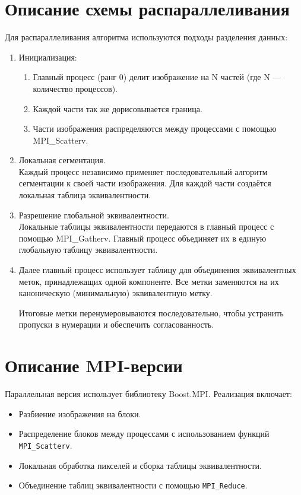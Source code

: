 \documentclass[a4paper,12pt]{article}
\begin{document}
\section{Описание схемы распараллеливания}
Для распараллеливания алгоритма используются подходы разделения данных:
\begin{enumerate}
    \item Инициализация:
    \begin{enumerate}
        \item Главный процесс (ранг 0) делит изображение на N частей (где N — количество процессов).
        \item Каждой части так же дорисовывается граница.
        \item Части изображения распределяются между процессами с помощью MPI\_Scatterv.
    \end{enumerate}
    \item Локальная сегментация.\\
    Каждый процесс независимо применяет последовательный алгоритм сегментации к своей части изображения. Для каждой части создаётся локальная таблица эквивалентности.

    \item Разрешение глобальной эквивалентности. \\
    Локальные таблицы эквивалентности передаются в главный процесс с помощью MPI\_Gatherv. Главный процесс объединяет их в единую глобальную таблицу эквивалентности.
    \item Далее главный процесс использует таблицу для объединения эквивалентных меток, принадлежащих одной компоненте. 
    Все метки заменяются на их каноническую (минимальную) эквивалентную метку.

    Итоговые метки перенумеровываются последовательно, чтобы устранить пропуски в нумерации и обеспечить согласованность.

\end{enumerate}

\section{Описание MPI-версии}
Параллельная версия использует библиотеку Boost.MPI. Реализация включает:
\begin{itemize}
    \item Разбиение изображения на блоки.
    \item Распределение блоков между процессами с использованием функций \texttt{MPI\_Scatterv}.
    \item Локальная обработка пикселей и сборка таблицы эквивалентности.
    \item Объединение таблиц эквивалентности с помощью \texttt{MPI\_Reduce}.
\end{itemize}
\end{document}
